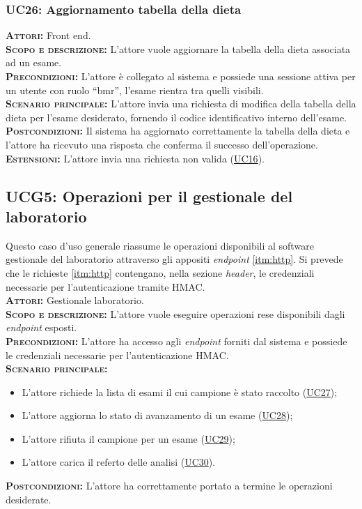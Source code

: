 \subsubsection{UC26: Aggiornamento tabella della dieta}
\label{sec:UC26}
\textsc{\textbf{Attori:}} Front end.\\
\textsc{\textbf{Scopo e descrizione:}} L'attore vuole aggiornare la tabella della dieta associata ad un esame.\\
\textsc{\textsc{\textbf{Precondizioni:}}} L'attore è collegato al sistema e possiede una sessione attiva per un utente con ruolo ``bmr'', l'esame rientra tra quelli visibili.\\
\textsc{\textbf{Scenario principale:}}  L'attore invia una richiesta di modifica della tabella della dieta per l'esame desiderato, fornendo il codice identificativo interno dell'esame.\\
\textsc{\textbf{Postcondizioni:}} Il sistema ha aggiornato correttamente la tabella della dieta e l'attore ha ricevuto una risposta che conferma il successo dell'operazione.\\
\textsc{\textbf{Estensioni:}} L'attore invia una richiesta non valida (\hyperref[sec:UC16]{UC16}).

\subsection{UCG5: Operazioni per il gestionale del laboratorio}
\label{sec:UCG5}
Questo caso d'uso generale riassume le operazioni disponibili al software gestionale del laboratorio attraverso gli appositi \textit{endpoint} \ref{itm:http}. Si prevede che le richieste \ref{itm:http} contengano, nella sezione \textit{header}, le credenziali necessarie per l'autenticazione tramite HMAC.\\ 
\textsc{\textbf{Attori:}} Gestionale laboratorio.\\
\textsc{\textbf{Scopo e descrizione:}} L'attore vuole eseguire operazioni rese disponibili dagli \textit{endpoint} esposti.\\
\textsc{\textbf{Precondizioni:}} L'attore ha accesso agli \textit{endpoint} forniti dal sistema e possiede le credenziali necessarie per l'autenticazione HMAC.\\
\textsc{\textbf{Scenario principale:}} 
\begin{itemize}
    \item L'attore richiede la lista di esami il cui campione è stato raccolto (\hyperref[sec:UC27]{UC27});
    \item L'attore aggiorna lo stato di avanzamento di un esame (\hyperref[sec:UC28]{UC28});
    \item L'attore rifiuta il campione per un esame (\hyperref[sec:UC29]{UC29});
    \item L'attore carica il referto delle analisi (\hyperref[sec:UC30]{UC30}).
\end{itemize}
\textsc{\textbf{Postcondizioni:}} L'attore ha correttamente portato a termine le operazioni desiderate.

